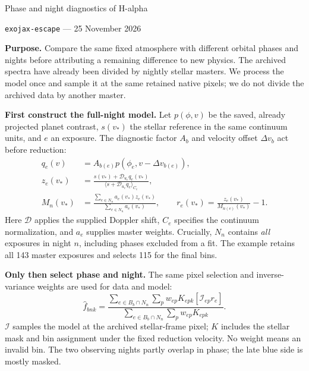 \documentclass[10pt,a4paper]{article}
\begin{document}
\begin{center}
{\Large Phase and night diagnostics of H-alpha}\par\vspace{4pt}
\texttt{exojax-escape} --- 25 November 2026
\end{center}

\textbf{Purpose.} Compare the same fixed atmosphere with different orbital
phases and nights before attributing a remaining difference to new physics.
The archived spectra have already been divided by nightly stellar masters.
We process the model once and sample it at the same retained native pixels;
we do not divide the archived data by another master.

\textbf{First construct the full-night model.}
Let $p(\phi,v)$ be the saved, already projected planet contrast,
$s(v_*)$ the stellar reference in the same continuum units, and $e$ an exposure.
The diagnostic factor $A_b$ and velocity offset $\Delta v_b$ act before reduction:
\begin{align}
q_e(v)&=A_{b(e)}p(\phi_e,v-\Delta v_{b(e)}),\nonumber\\
z_e(v_*)&=\frac{s(v_*)+\mathcal D_{u_e}q_e(v_*)}
 {\langle s+\mathcal D_{u_e}q_e\rangle_{C_e}},\nonumber\\
M_n(v_*)&=\frac{\sum_{e\in N_n}a_e(v_*)z_e(v_*)}
 {\sum_{e\in N_n}a_e(v_*)},\qquad
r_e(v_*)=\frac{z_e(v_*)}{M_{n(e)}(v_*)}-1.\label{eq:master}
\end{align}
Here $\mathcal D$ applies the supplied Doppler shift, $C_e$ specifies the
continuum normalization, and $a_e$ supplies master weights. Crucially, $N_n$
contains \emph{all} exposures in night $n$, including phases excluded from a fit.
The example retains all 143 master exposures and selects 115 for the final bins.

\textbf{Only then select phase and night.}
The same pixel selection and inverse-variance weights are used for data and model:
\begin{equation}
\widehat f_{bnk}=
\frac{\sum_{e\in B_b\cap N_n}\sum_p w_{ep}K_{epk}
       [\mathcal I_{ep}r_e]}
     {\sum_{e\in B_b\cap N_n}\sum_p w_{ep}K_{epk}}.
\label{eq:coadd}
\end{equation}
$\mathcal I$ samples the model at the archived stellar-frame pixel;
$K$ includes the stellar mask and bin assignment under the fixed reduction
velocity. No weight means an invalid bin. The two observing nights partly
overlap in phase; the late blue side is mostly masked.
\end{document}
